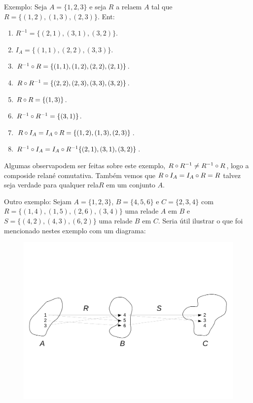 Exemplo: Seja $A=\{1,2,3\}$ e seja $R$ a rela\cao em $A$ tal que $R=\{(1,2),(1,3),(2,3)\}$. Ent\aoi:
\begin{enumerate}[{\bf a)}]
\item $R^{-1}=\{(2,1),(3,1),(3,2)\}$.
\item $I_A=\{(1,1),(2,2),(3,3)\}$.
\item $R^{-1}\circ R=\{(1,1),(1,2),(2,2),(2,1)\}$.
\item $R\circ R^{-1}=\{(2,2),(2,3),(3,3),(3,2)\}$.
\item $R\circ R=\{(1,3)\}$.
\item $R^{-1}\circ R^{-1}=\{(3,1)\}$.
\item $R\circ I_A=I_A\circ R=\{(1,2),(1,3),(2,3)\}$.
\item $R^{-1}\circ I_A=I_A\circ R^{-1}\{(2,1),(3,1),(3,2)\}$. 
\end{enumerate}
Algumas observa\coes podem ser feitas sobre este exemplo, $R\circ R^{-1}\neq R^{-1}\circ R$, logo a composi\cao de rela\coes n\ao \'e comutativa. Tamb\'em vemos que $R\circ I_A=I_A\circ R=R$ talvez seja verdade para qualquer rela\cao $R$ em um conjunto $A$.

Outro exemplo: Sejam $A=\{1,2,3\}$, $B=\{4,5,6\}$ e $C=\{2,3,4\}$ com $R=\{(1,4),(1,5),(2,6),(3,4)\}$ uma rela\cao de $A$ em $B$ e $S=\{(4,2),(4,3),(6,2)\}$ uma rela\cao de $B$ em $C$. Seria \'util ilustrar o que foi mencionado nestes exemplo com um diagrama:
\begin{figure}[h]
\begin{center}
\includegraphics[width=15cm,trim={0.5cm 7cm 0.5cm 6.8cm},clip]{./figuras/figure21.pdf}
\end{center}
\end{figure}


